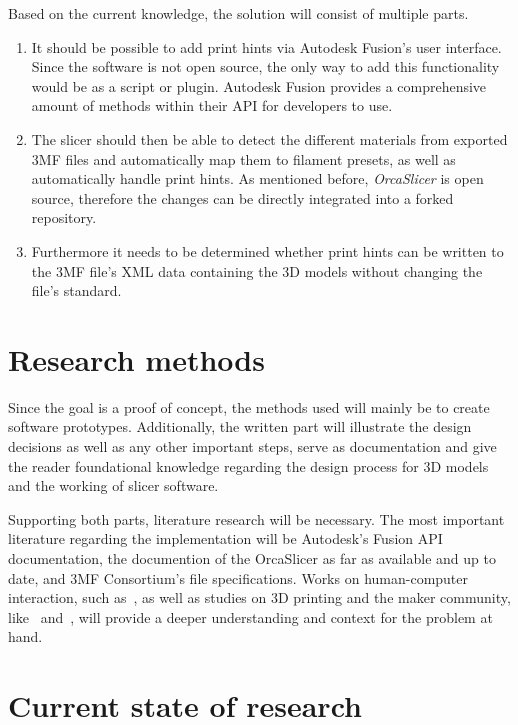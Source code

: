 Based on the current knowledge, the solution will consist of multiple parts. 
\begin{enumerate}
    \item It should be possible to add print hints via Autodesk Fusion's user interface. Since the software is not open source, the only way to add this functionality would be as a script or plugin. Autodesk Fusion provides a comprehensive amount of methods within their API for developers to use. 
    \item The slicer should then be able to detect the different materials from exported 3MF files and automatically map them to filament presets, as well as automatically handle print hints. As mentioned before, \emph{OrcaSlicer} is open source, therefore the changes can be directly integrated into a forked repository. 
    \item Furthermore it needs to be determined whether print hints can be written to the 3MF file's XML data containing the 3D models without changing the file's standard.
\end{enumerate}

\section{Research methods}

Since the goal is a proof of concept, the methods used will mainly be to create software prototypes.
Additionally, the written part will illustrate the design decisions as well as any other important steps, serve as documentation and give the reader foundational knowledge regarding the design process for 3D models and the working of slicer software. 

Supporting both parts, literature research will be necessary. 
The most important literature regarding the implementation will be Autodesk's Fusion API documentation\cite{autodesk_inc_fusion_2025}, the documention of the OrcaSlicer\cite{softfever_orcaslicerdoc_nodate} as far as available and up to date, and 3MF Consortium's file specifications\cite{3mf_consortium_3mf_nodate}. 
Works on human-computer interaction, such as~\cite{jacko_human_2012}, as well as studies on 3D printing and the maker community, like~\cite{walter-herrmann_fablab_2014} and~\cite{hudson_understanding_2016}, will provide a deeper understanding and context for the problem at hand. 

\section{Current state of research}


